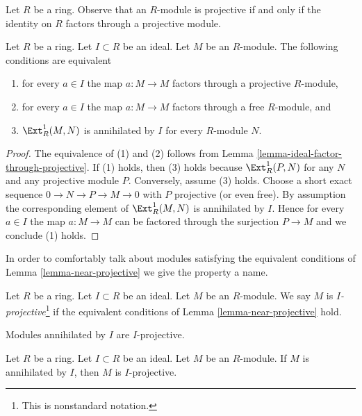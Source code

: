\noindent
Let $R$ be a ring. Observe that an $R$-module is projective if and
only if the identity on $R$ factors through a projective module.

\begin{lemma}
\label{lemma-near-projective}
Let $R$ be a ring. Let $I \subset R$ be an ideal. Let $M$ be an $R$-module.
The following conditions are equivalent
\begin{enumerate}
\item for every $a \in I$ the map $a : M \to M$ factors through a projective
$R$-module,
\item for every $a \in I$ the map $a : M \to M$ factors through a free
$R$-module, and
\item $\Ext^1_R(M, N)$ is annihilated by $I$ for every $R$-module $N$.
\end{enumerate}
\end{lemma}

\begin{proof}
The equivalence of (1) and (2) follows from
Lemma \ref{lemma-ideal-factor-through-projective}.
If (1) holds, then (3) holds because $\Ext^1_R(P, N)$
for any $N$ and any projective module $P$.
Conversely, assume (3) holds. Choose a short exact sequence
$0 \to N \to P \to M \to 0$ with $P$ projective (or even free).
By assumption the corresponding element of $\Ext^1_R(M, N)$
is annihilated by $I$. Hence for every $a \in I$ the map
$a : M \to M$ can be factored through the surjection $P \to M$
and we conclude (1) holds.
\end{proof}

\noindent
In order to comfortably talk about modules satisfying the equivalent
conditions of Lemma \ref{lemma-near-projective} we give the property a name.

\begin{definition}
\label{definition-near-projective}
Let $R$ be a ring. Let $I \subset R$ be an ideal. Let $M$ be an $R$-module.
We say $M$ is {\it $I$-projective}\footnote{This is nonstandard notation.}
if the equivalent conditions of Lemma \ref{lemma-near-projective} hold.
\end{definition}

\noindent
Modules annihilated by $I$ are $I$-projective.

\begin{lemma}
\label{lemma-torsion-near-projective}
Let $R$ be a ring. Let $I \subset R$ be an ideal. Let $M$ be an $R$-module.
If $M$ is annihilated by $I$, then $M$ is $I$-projective.
\end{lemma}

